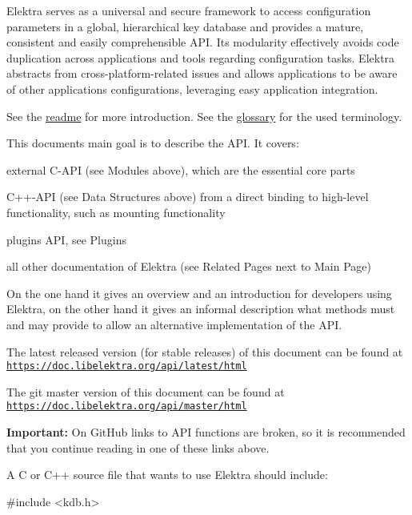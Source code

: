 Elektra serves as a universal and secure framework to access configuration parameters in a global, hierarchical key database and provides a mature, consistent and easily comprehensible A\+PI. Its modularity effectively avoids code duplication across applications and tools regarding configuration tasks. Elektra abstracts from cross-\/platform-\/related issues and allows applications to be aware of other applications\textquotesingle{} configurations, leveraging easy application integration.

See the \hyperlink{README_md}{readme} for more introduction. See the \hyperlink{doc_help_elektra-glossary_md}{glossary} for the used terminology.

This document\textquotesingle{}s main goal is to describe the A\+PI. It covers\+:


\begin{DoxyItemize}
\item external C-\/\+A\+PI (see Modules above), which are the essential core parts
\item C++-\/\+A\+PI (see Data Structures above) from a direct binding to high-\/level functionality, such as mounting functionality
\item plugins A\+PI, see Plugins
\item all other documentation of Elektra (see Related Pages next to Main Page)
\end{DoxyItemize}

On the one hand it gives an overview and an introduction for developers using Elektra, on the other hand it gives an informal description what methods must and may provide to allow an alternative implementation of the A\+PI.

The latest released version (for stable releases) of this document can be found at \href{https://doc.libelektra.org/api/latest/html}{\tt https\+://doc.\+libelektra.\+org/api/latest/html}

The git master version of this document can be found at \href{https://doc.libelektra.org/api/master/html}{\tt https\+://doc.\+libelektra.\+org/api/master/html}

{\bfseries Important\+:} On Git\+Hub links to A\+PI functions are broken, so it is recommended that you continue reading in one of these links above.

A C or C++ source file that wants to use Elektra should include\+:


\begin{DoxyCode}
\textcolor{preprocessor}{#include <kdb.h>}
\end{DoxyCode}



